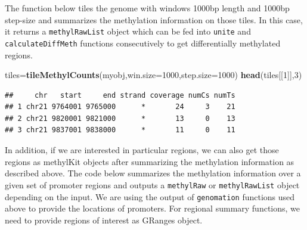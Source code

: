 \documentclass[12pt,]{krantz}
\newenvironment{Shaded}{\begin{snugshade}}{\end{snugshade}}
\newcommand{\CommentTok}[1]{\textcolor[rgb]{0.56,0.35,0.01}{\textit{#1}}}
\newcommand{\DataTypeTok}[1]{\textcolor[rgb]{0.13,0.29,0.53}{#1}}
\newcommand{\DecValTok}[1]{\textcolor[rgb]{0.00,0.00,0.81}{#1}}
\newcommand{\KeywordTok}[1]{\textcolor[rgb]{0.13,0.29,0.53}{\textbf{#1}}}
\newcommand{\NormalTok}[1]{#1}
\newcommand{\OperatorTok}[1]{\textcolor[rgb]{0.81,0.36,0.00}{\textbf{#1}}}
\newcommand{\StringTok}[1]{\textcolor[rgb]{0.31,0.60,0.02}{#1}}
\begin{document}
The function below tiles the genome with windows 1000bp length and 1000bp step-size and summarizes the methylation information on those tiles. In this case, it returns a \texttt{methylRawList} object which can be fed into \texttt{unite} and \texttt{calculateDiffMeth} functions consecutively to get differentially methylated regions.

\begin{Shaded}
\begin{Highlighting}[]
\NormalTok{tiles=}\KeywordTok{tileMethylCounts}\NormalTok{(myobj,}\DataTypeTok{win.size=}\DecValTok{1000}\NormalTok{,}\DataTypeTok{step.size=}\DecValTok{1000}\NormalTok{)}
\KeywordTok{head}\NormalTok{(tiles[[}\DecValTok{1}\NormalTok{]],}\DecValTok{3}\NormalTok{)}
\end{Highlighting}
\end{Shaded}

\begin{verbatim}
##     chr   start     end strand coverage numCs numTs
## 1 chr21 9764001 9765000      *       24     3    21
## 2 chr21 9820001 9821000      *       13     0    13
## 3 chr21 9837001 9838000      *       11     0    11
\end{verbatim}

In addition, if we are interested in particular regions, we can also get those regions as methylKit objects after summarizing the methylation information as described above. The code below summarizes the methylation information over a given set of promoter regions and outputs a \texttt{methylRaw} or \texttt{methylRawList} object depending on the input. We are using the output of
\texttt{genomation} functions used above to provide the locations of promoters. For regional summary functions, we need to
provide regions of interest as GRanges object.

\begin{Shaded}
\end{Shaded}
\end{document}
